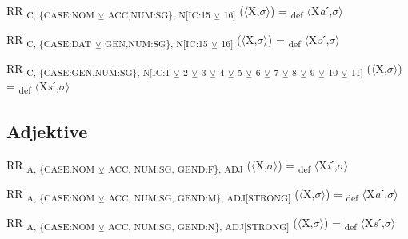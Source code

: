 {\begin{exe}
 RR \textsubscript{C, \{CASE:NOM} \textsubscript{${\veebar}$}\textsubscript{ ACC,NUM:SG\}, N[IC:15} \textsubscript{${\veebar}$}\textsubscript{ 16]} ($\langle$X,$\sigma $$\rangle$) = \textsubscript{def} $\langle$X\textit{a}ˊ,$\sigma $$\rangle$
\end{exe}

\begin{exe}
 RR \textsubscript{C, \{CASE:DAT} \textsubscript{${\veebar}$}\textsubscript{ GEN,NUM:SG\}, N[IC:15} \textsubscript{${\veebar}$}\textsubscript{ 16]} ($\langle$X,$\sigma $$\rangle$) = \textsubscript{def} $\langle$X\textit{ə}ˊ,$\sigma $$\rangle$
\end{exe}

\begin{exe}
 RR \textsubscript{C, \{CASE:GEN,NUM:SG\}, N[IC:1} \textsubscript{${\veebar}$}\textsubscript{ 2} \textsubscript{${\veebar}$}\textsubscript{ 3} \textsubscript{${\veebar}$}\textsubscript{ 4} \textsubscript{${\veebar}$}\textsubscript{ 5} \textsubscript{${\veebar}$}\textsubscript{ 6} \textsubscript{${\veebar}$}\textsubscript{ 7} \textsubscript{${\veebar}$}\textsubscript{ 8} \textsubscript{${\veebar}$}\textsubscript{ 9} \textsubscript{${\veebar}$}\textsubscript{ 10} \textsubscript{${\veebar}$}\textsubscript{ 11]} ($\langle$X,$\sigma $$\rangle$) = \textsubscript{def} $\langle$X\textit{s}ˊ,$\sigma $$\rangle$
\end{exe}

\subsection{Adjektive}

\begin{exe}
 RR \textsubscript{A, \{CASE:NOM} \textsubscript{${\veebar}$}\textsubscript{ ACC, NUM:SG, GEND:F\}, ADJ} ($\langle$X,$\sigma $$\rangle$) = \textsubscript{def} $\langle$X\textit{i}ˊ,$\sigma $$\rangle$
\end{exe}

\begin{exe}
 RR \textsubscript{A, \{CASE:NOM} \textsubscript{${\veebar}$}\textsubscript{ ACC, NUM:SG, GEND:M\}, ADJ[STRONG]} ($\langle$X,$\sigma $$\rangle$) = \textsubscript{def} $\langle$X\textit{a}ˊ,$\sigma $$\rangle$
\end{exe}

\begin{exe}
 RR \textsubscript{A, \{CASE:NOM} \textsubscript{${\veebar}$}\textsubscript{ ACC, NUM:SG, GEND:N\}, ADJ[STRONG]} ($\langle$X,$\sigma $$\rangle$) = \textsubscript{def} $\langle$X\textit{s}ˊ,$\sigma $$\rangle$
\end{exe}

}
